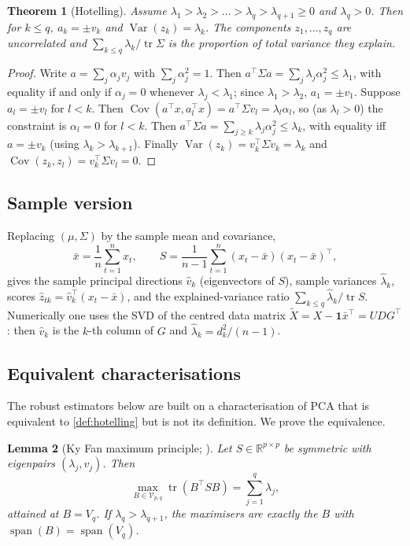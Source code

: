 \documentclass[11pt]{article}
\newtheorem{theorem}{Theorem}[section]
\newtheorem{lemma}[theorem]{Lemma}
\theoremstyle{definition}
\theoremstyle{remark}
\DeclareMathOperator{\tr}{tr}
\DeclareMathOperator{\spn}{span}
\DeclareMathOperator{\Var}{Var}
\DeclareMathOperator{\Cov}{Cov}
\newcommand{\R}{\mathbb{R}}
\newcommand{\V}{\mathcal{V}}
\newcommand{\one}{\mathbf{1}}
\begin{document}
\begin{theorem}[Hotelling]\label{thm:hotelling}
Assume $\lambda_1>\lambda_2>\dots>\lambda_q>\lambda_{q+1}\ge 0$ and $\lambda_q>0$.
Then for $k\le q$, $a_k=\pm v_k$ and $\Var(z_k)=\lambda_k$.
The components $z_1,\dots,z_q$ are uncorrelated and
$\sum_{k\le q}\lambda_k/\tr\Sigma$ is the proportion of total variance they explain.
\end{theorem}

\begin{proof}
Write $a=\sum_j\alpha_jv_j$ with $\sum_j\alpha_j^2=1$. Then $a^\top\Sigma a=\sum_j\lambda_j\alpha_j^2\le\lambda_1$,
with equality if and only if $\alpha_j=0$ whenever $\lambda_j<\lambda_1$; since $\lambda_1>\lambda_2$,
$a_1=\pm v_1$. Suppose $a_l=\pm v_l$ for $l<k$. Then $\Cov(a^\top x,a_l^\top x)=a^\top\Sigma v_l=\lambda_l\alpha_l$,
so (as $\lambda_l>0$) the constraint is $\alpha_l=0$ for $l<k$. Then $a^\top\Sigma a=\sum_{j\ge k}\lambda_j\alpha_j^2\le\lambda_k$,
with equality iff $a=\pm v_k$ (using $\lambda_k>\lambda_{k+1}$). Finally $\Var(z_k)=v_k^\top\Sigma v_k=\lambda_k$ and
$\Cov(z_k,z_l)=v_k^\top\Sigma v_l=0$.
\end{proof}

\subsection{Sample version}
Replacing $(\mu,\Sigma)$ by the sample mean and covariance,
\begin{equation}\label{eq:sample}
\bar x=\frac1n\sum_{t=1}^n x_t,\qquad
S=\frac1{n-1}\sum_{t=1}^n(x_t-\bar x)(x_t-\bar x)^\top,
\end{equation}
gives the sample principal directions $\hat v_k$ (eigenvectors of $S$), sample variances
$\hat\lambda_k$, scores $\hat z_{tk}=\hat v_k^\top(x_t-\bar x)$, and the explained-variance ratio
$\sum_{k\le q}\hat\lambda_k/\tr S$. Numerically one uses the SVD of the centred data matrix
$\tilde X=X-\one\bar x^\top=U D G^\top$: then $\hat v_k$ is the $k$-th column of $G$ and $\hat\lambda_k=d_k^2/(n-1)$.

\subsection{Equivalent characterisations}

The robust estimators below are built on a characterisation of PCA that is equivalent to
\cref{def:hotelling} but is not its definition. We prove the equivalence.

\begin{lemma}[Ky Fan maximum principle; \citealp{Fan1949}]\label{lem:kyfan}
Let $S\in\R^{p\times p}$ be symmetric with eigenpairs $(\lambda_j,v_j)$. Then
\[
\max_{B\in\V_{p,q}}\tr(B^\top SB)=\sum_{j=1}^q\lambda_j,
\]
attained at $B=V_q$. If $\lambda_q>\lambda_{q+1}$, the maximisers are exactly the $B$ with
$\spn(B)=\spn(V_q)$.
\end{lemma}
\end{document}
